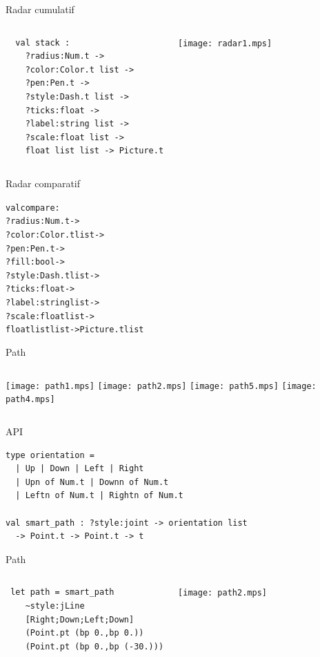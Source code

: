 \documentclass{beamer}
\begin{document}
\begin{frame}[fragile]{Radar cumulatif}
  \begin{columns}
\begin{verbatim}
  val stack :
    ?radius:Num.t ->
    ?color:Color.t list ->
    ?pen:Pen.t ->
    ?style:Dash.t list ->
    ?ticks:float ->
    ?label:string list ->
    ?scale:float list ->
    float list list -> Picture.t
\end{verbatim}
    \texttt{[image: radar1.mps]}
  \end{columns}
\end{frame}


\begin{frame}[fragile]{Radar comparatif}
\begin{alltt}
  val compare :
    ?radius:Num.t ->
    ?color:Color.t list ->
    ?pen:Pen.t ->
    \color{red}?fill:bool ->
\color{black}    ?style:Dash.t list ->
    ?ticks:float ->
    ?label:string list ->
    ?scale:float list ->
    float list list -> Picture.t \color{red}list
\end{alltt}
\end{frame}


\begin{frame}[fragile]{Path}
  \begin{columns}
    \texttt{[image: path1.mps]}
    \bigskip
    \bigskip
    \texttt{[image: path2.mps]}
    \texttt{[image: path5.mps]}
    \bigskip
    \bigskip
    \texttt{[image: path4.mps]}
  \end{columns}
\end{frame}


\begin{frame}[fragile]{API}
\begin{verbatim}
type orientation = 
  | Up | Down | Left | Right
  | Upn of Num.t | Downn of Num.t 
  | Leftn of Num.t | Rightn of Num.t
  
val smart_path : ?style:joint -> orientation list 
  -> Point.t -> Point.t -> t
\end{verbatim}
\end{frame}


\begin{frame}[fragile]{Path}
  \begin{columns}
\begin{verbatim}
 let path = smart_path 
    ~style:jLine
    [Right;Down;Left;Down]
    (Point.pt (bp 0.,bp 0.)) 
    (Point.pt (bp 0.,bp (-30.)))
\end{verbatim}
    \texttt{[image: path2.mps]}
\end{columns}
\end{frame}
\end{document}
